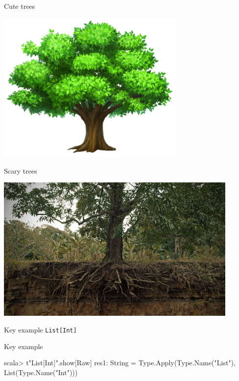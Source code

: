 \documentclass[svgnames,dvipsnames,hyperref={bookmarks=false},usepdftitle=false]{beamer}
\begin{document}
\begin{frame}[c, fragile]{Cute trees}
\begin{center}
\includegraphics[height=7.5cm]{tree-cute.png}
\end{center}
\end{frame}

\begin{frame}[c, fragile]{Scary trees}
\begin{center}
\includegraphics[height=7.2cm]{tree-scary.jpg}
\end{center}
\end{frame}

\begin{frame}[fragile]{Key example}
\texttt{List[Int]}
\end{frame}

\begin{frame}[fragile]{Key example}
\begin{semiverbatim}
\small
scala> t"List[Int]".show[Raw]
res1: String =
Type.Apply(Type.Name("List"), List(Type.Name("Int")))

\end{semiverbatim}
\end{frame}
\end{document}
